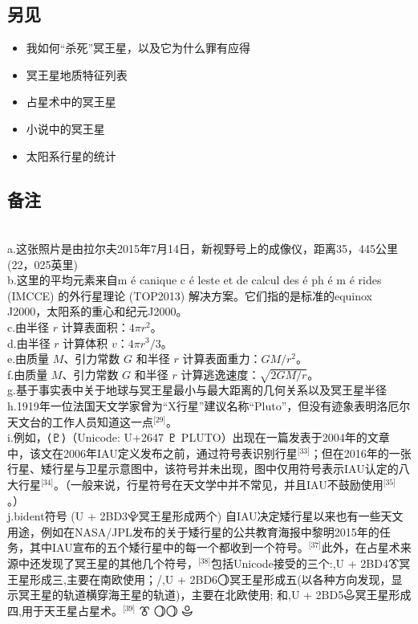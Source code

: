\subsection{另见}
\begin{itemize}
\item 我如何“杀死”冥王星，以及它为什么罪有应得
\item 冥王星地质特征列表
\item 占星术中的冥王星
\item 小说中的冥王星
\item 太阳系行星的统计
\end{itemize}
\subsection{备注}\\
a.这张照片是由拉尔夫2015年7月14日，新视野号上的成像仪，距离35，445公里 (22，025英里)\\
b.这里的平均元素来自m é canique c é leste et de calcul des é ph é m é rides (IMCCE) 的外行星理论 (TOP2013) 解决方案。它们指的是标准的equinox J2000，太阳系的重心和纪元J2000。\\
c.由半径 \(r\) 计算表面积：\(4\pi r^{2}\)。\\
d.由半径 \(r\) 计算体积 \(v\)：\(4\pi r^{3}/3\)。\\
e.由质量 \(M\)、引力常数 \(G\) 和半径 \(r\) 计算表面重力：\(GM/r^{2}\)。\\
f.由质量 \(M\)、引力常数 \(G\) 和半径 \(r\) 计算逃逸速度：\(\sqrt{2GM/r}\)。\\
g.基于事实表中关于地球与冥王星最小与最大距离的几何关系以及冥王星半径\\
h.1919年一位法国天文学家曾为“X行星”建议名称“Pluto”，但没有迹象表明洛厄尔天文台的工作人员知道这一点\(^\text{[29]}\)。\\
i.例如，⟨♇⟩（Unicode: U+2647 ♇ PLUTO）出现在一篇发表于2004年的文章中，该文在2006年IAU定义发布之前，通过符号表识别行星\(^\text{[33]}\)；但在2016年的一张行星、矮行星与卫星示意图中，该符号并未出现，图中仅用符号表示IAU认定的八大行星\(^\text{[34]}\)。（一般来说，行星符号在天文学中并不常见，并且IAU不鼓励使用\(^\text{[35]}\)。）\\
j.bident符号 (U + 2BD3⯓冥王星形成两个) 自IAU决定矮行星以来也有一些天文用途，例如在NASA/JPL发布的关于矮行星的公共教育海报中黎明2015年的任务，其中IAU宣布的五个矮行星中的每一个都收到一个符号。\(^\text{[37]}\)此外，在占星术来源中还发现了冥王星的其他几个符号，\(^\text{[38]}\)包括Unicode接受的三个:,U + 2BD4⯔冥王星形成三,主要在南欧使用；/,U + 2BD6⯖冥王星形成五(以各种方向发现，显示冥王星的轨道横穿海王星的轨道)，主要在北欧使用; 和,U + 2BD5⯕冥王星形成四,用于天王星占星术。\(^\text{[39]}\) ⯔ ⯖⯖ ⯕\\
